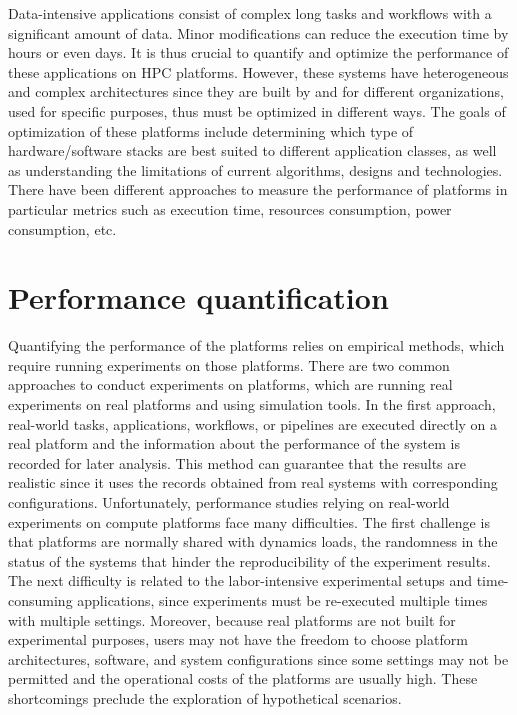 Data-intensive applications consist of complex long tasks and workflows 
with a significant amount of data. 
Minor modifications can reduce the execution time by hours or even days.
It is thus crucial to quantify and optimize the performance of these applications 
on HPC platforms. 
However, these systems have heterogeneous and complex architectures since they 
are built by and for different organizations, used for specific purposes, thus must be 
optimized in different ways. 
The goals of optimization of these platforms include determining which type of 
hardware/software stacks are best suited to different application classes, 
as well as understanding the limitations of current algorithms, 
designs and technologies. 
There have been different approaches to measure the performance 
of platforms in particular metrics such as execution time, 
resources consumption, power consumption, etc. 

\section{Performance quantification}

Quantifying the performance of the platforms relies on empirical methods, 
which require running experiments on those platforms. 
There are two common approaches to conduct experiments on platforms, 
which are running real experiments on real platforms and using simulation tools. 
In the first approach, real-world tasks, applications, workflows, or pipelines are executed 
directly on a real platform and the information about the performance of the system 
is recorded for later analysis. 
This method can guarantee that the results are realistic since it uses the records 
obtained from real systems with corresponding configurations.
Unfortunately, performance studies relying on real-world experiments on 
compute platforms face many difficulties.
The first challenge is that platforms are normally shared with dynamics loads,
the randomness in the status of the systems that hinder the reproducibility 
of the experiment results.
The next difficulty is related to the labor-intensive experimental setups and 
time-consuming applications, since experiments must be re-executed 
multiple times with multiple settings. 
Moreover, because real platforms are not built for experimental purposes,
users may not have the freedom to choose platform architectures, software, and 
system configurations since some settings may not be permitted and the 
operational costs of the platforms are usually high. 
These shortcomings preclude the exploration of hypothetical scenarios.

